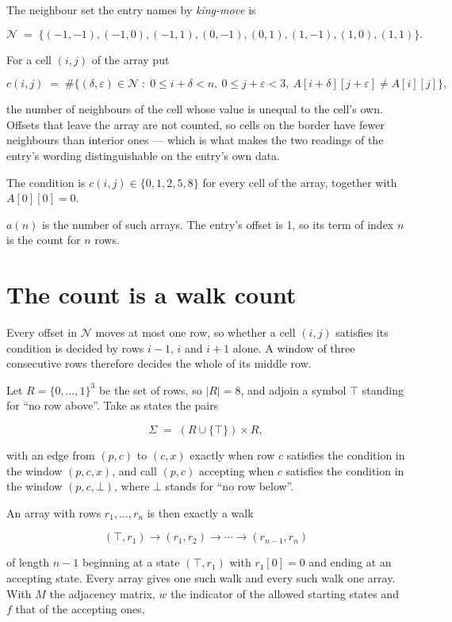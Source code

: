 \documentclass[11pt]{article}
\theoremstyle{definition}
\begin{document}
The neighbour set the entry names by {\itshape king-move} is

\[\mathcal{N} \;=\; \{(-1,-1), (-1,0), (-1,1), (0,-1), (0,1), (1,-1), (1,0), (1,1)\}.\]

For a cell $(i,j)$ of the array put

\[c(i,j) \;=\; \#\bigl\{(\delta,\varepsilon)\in\mathcal{N} \;:\; 0\le i+\delta<n,\ 0\le j+\varepsilon<3,\ A[i+\delta][j+\varepsilon] \neq A[i][j]\bigr\},\]

the number of neighbours of the cell whose value is unequal to the cell's own. Offsets that leave the array are not counted, so cells on the border have fewer neighbours than interior ones --- which is what makes the two readings of the entry's wording distinguishable on the entry's own data.

The condition is $c(i,j) \in \{0, 1, 2, 5, 8\}$ for every cell of the array, together with $A[0][0]=0$.

$a(n)$ is the number of such arrays. The entry's offset is 1, so its term of index $n$ is the count for $n$ rows.

\section{The count is a walk count}

Every offset in $\mathcal{N}$ moves at most one row, so whether a cell $(i,j)$ satisfies its condition is decided by rows $i-1$, $i$ and $i+1$ alone. A window of three consecutive rows therefore decides the whole of its middle row.

Let $R = \{0,\dots,1\}^{3}$ be the set of rows, so $|R| = 8$, and adjoin a symbol $\top$ standing for ``no row above''. Take as states the pairs

\[\Sigma \;=\; (R \cup \{\top\}) \times R,\]

with an edge from $(p,c)$ to $(c,x)$ exactly when row $c$ satisfies the condition in the window $(p,c,x)$, and call $(p,c)$ accepting when $c$ satisfies the condition in the window $(p,c,\bot)$, where $\bot$ stands for ``no row below''.

An array with rows $r_1,\dots,r_n$ is then exactly a walk

\[(\top,r_1) \to (r_1,r_2) \to \cdots \to (r_{n-1},r_n)\]

of length $n-1$ beginning at a state $(\top,r_1)$ with $r_1[0]=0$ and ending at an accepting state. Every array gives one such walk and every such walk one array. With $M$ the adjacency matrix, $w$ the indicator of the allowed starting states and $f$ that of the accepting ones,
\end{document}
